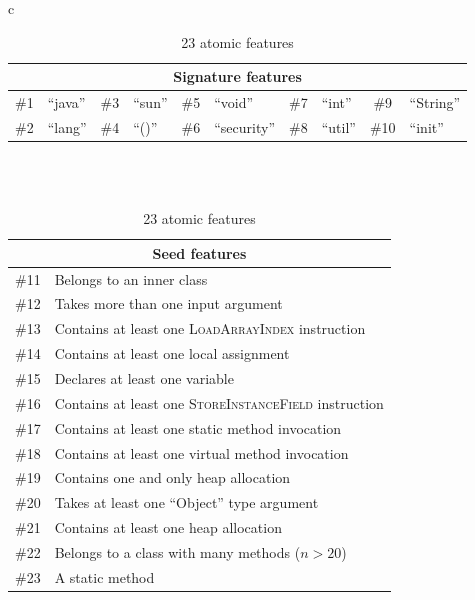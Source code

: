 \begin{table}[t]
     \centering
    \caption{23 atomic features}
    \label{tbl:features}
\begin{tabular}{c}
    \begin{tabular}{clclclclcl}
        \toprule
        \multicolumn{10}{c}{Signature features} \\
        \midrule
        \#1 & ``java'' & \#3 & ``sun''  &
        \#5 & ``void'' & \#7 & ``int'' &
        \#9 & ``String'' \\
        \#2 & ``lang'' & \#4 & ``()''  &
        \#6 & ``security'' & \#8 & ``util'' &
        \#10 & ``init'' \\
        \bottomrule
    \end{tabular}
\\
\\
    \begin{tabular}{cl}
        \toprule
        \multicolumn{2}{c}{Seed features} \\
        \midrule
         \#11 & Belongs to an inner class\\
         \#12 & Takes more than one input argument\\
         \#13 & Contains at least one \textsc{LoadArrayIndex} instruction\\
         \#14 & Contains at least one local assignment\\
         \#15 & Declares at least one variable\\
         \#16 & Contains at least one \textsc{StoreInstanceField} instruction\\
         \#17 & Contains at least one static method invocation\\
         \#18 & Contains at least one virtual method invocation\\
         \#19 & Contains one and only heap allocation \\
         \#20 & Takes at least one ``Object'' type argument \\
         \#21 & Contains at least one heap allocation \\
         \#22 & Belongs to a class with many methods ($n>20$) \\
         \#23 & A static method \\
        \bottomrule
    \end{tabular}
\end{tabular}
\end{table}


